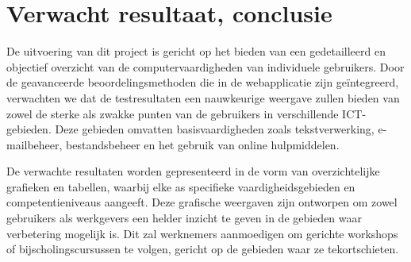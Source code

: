 

\section{Verwacht resultaat, conclusie}%
\label{sec:verwachte_resultaten}




De uitvoering van dit project is gericht op het bieden van een gedetailleerd en objectief overzicht van de computervaardigheden van individuele gebruikers. Door de geavanceerde beoordelingsmethoden die in de webapplicatie zijn geïntegreerd, verwachten we dat de testresultaten een nauwkeurige weergave zullen bieden van zowel de sterke als zwakke punten van de gebruikers in verschillende ICT-gebieden. Deze gebieden omvatten basisvaardigheden zoals tekstverwerking, e-mailbeheer, bestandsbeheer en het gebruik van online hulpmiddelen.

De verwachte resultaten worden gepresenteerd in de vorm van overzichtelijke grafieken en tabellen, waarbij elke as specifieke vaardigheidsgebieden en competentieniveaus aangeeft. Deze grafische weergaven zijn ontworpen om zowel gebruikers als werkgevers een helder inzicht te geven in de gebieden waar verbetering mogelijk is. Dit zal werknemers aanmoedigen om gerichte workshops of bijscholingscursussen te volgen, gericht op de gebieden waar ze tekortschieten.

